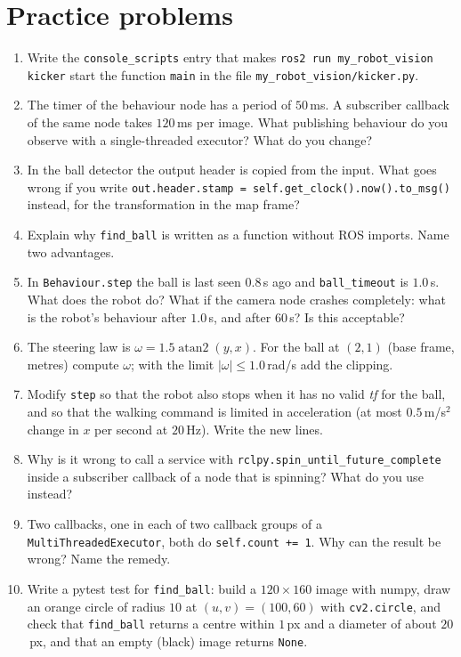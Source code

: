 \section*{Practice problems}
\begin{enumerate}[label=\textbf{\thechapter.\arabic*}]
  \item Write the \verb!console_scripts! entry that makes \verb!ros2 run my_robot_vision kicker! start the function \verb!main! in the file \verb!my_robot_vision/kicker.py!.
  \item The timer of the behaviour node has a period of $50$\,ms. A subscriber callback of the same node takes $120$\,ms per image. What publishing behaviour do you observe with a single-threaded executor? What do you change?
  \item In the ball detector the output header is copied from the input. What goes wrong if you write \verb!out.header.stamp = self.get_clock().now().to_msg()! instead, for the transformation in the map frame?
  \item Explain why \verb!find_ball! is written as a function without ROS imports. Name two advantages.
  \item In \verb!Behaviour.step! the ball is last seen $0.8$\,s ago and \verb!ball_timeout! is $1.0$\,s. What does the robot do? What if the camera node crashes completely: what is the robot's behaviour after $1.0$\,s, and after $60$\,s? Is this acceptable?
  \item The steering law is $\omega=1.5\operatorname{atan2}(y,x)$. For the ball at $(2,1)$ (base frame, metres) compute $\omega$; with the limit $|\omega|\le1.0$\,rad/s add the clipping.
  \item Modify \verb!step! so that the robot also stops when it has no valid \emph{tf} for the ball, and so that the walking command is limited in acceleration (at most $0.5$\,m/s$^2$ change in $x$ per second at $20$\,Hz). Write the new lines.
  \item Why is it wrong to call a service with \verb!rclpy.spin_until_future_complete! inside a subscriber callback of a node that is spinning? What do you use instead?
  \item Two callbacks, one in each of two callback groups of a \verb!MultiThreadedExecutor!, both do \verb!self.count += 1!. Why can the result be wrong? Name the remedy.
  \item[\textbf{\thechapter.10}$\star$] Write a pytest test for \verb!find_ball!: build a $120\times160$ image with numpy, draw an orange circle of radius $10$ at $(u,v)=(100,60)$ with \verb!cv2.circle!, and check that \verb!find_ball! returns a centre within $1$\,px and a diameter of about $20$\,px, and that an empty (black) image returns \verb!None!.
\end{enumerate}
